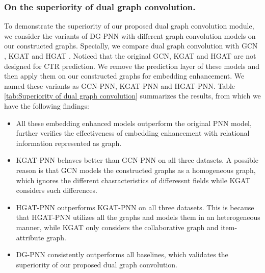 \subsubsection{On the superiority of dual graph convolution.}
To demonstrate the superiority of our proposed dual graph convolution module, we consider the variants of DG-PNN with different graph convolution models on our constructed graphs.
Specially, we compare dual graph convolution with GCN \cite{kipf2016semi}, KGAT \cite{wang2019kgat} and HGAT \cite{linmei2019heterogeneous}.
Noticed that the original GCN, KGAT and HGAT are not designed for CTR prediction.
We remove the prediction layer of these models and then apply them on our constructed graphs for embedding enhancement. We named these variants as GCN-PNN, KGAT-PNN and HGAT-PNN.
Table \ref{tab:Superiority of dual graph convolution} summarizes the results, from which we have the following findings:
\begin{itemize}
\item All these embedding enhanced models outperform the original PNN model, further verifies the effectiveness of embedding enhancement with relational information represented as graph.
\item KGAT-PNN behaves better than GCN-PNN on all three datasets. A possible reason is that GCN models the constructed graphs as a homogeneous graph, which ignores the different chasracteristics of differessnt fields while KGAT considers such differences.
\item HGAT-PNN outperforms KGAT-PNN on all three datasets.
This is because that HGAT-PNN utilizes all the graphs and models them in an heterogeneous manner, while KGAT only considers the collaborative graph and item-attribute graph.
\item DG-PNN consistently outperforms all baselines, which validates the superiority of our proposed dual graph convolution.
\end{itemize}


